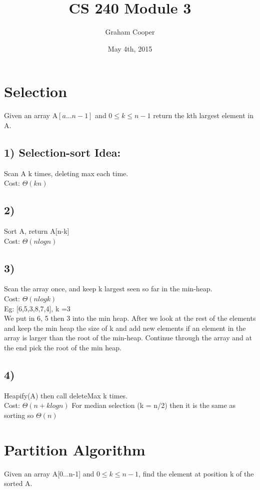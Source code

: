\documentclass[12pt]{article}
\title{\vspace{-15ex}CS 240 Module 3\vspace{-1ex}}
\date{May 4th, 2015}
\author{Graham Cooper}
\begin{document}
	\maketitle
	
	\section*{Selection}
	Given an array A$[a...n-1]$ and $0 \leq k \leq n-1$ return the kth largest element in A.\\
	
	\subsection{1) Selection-sort Idea:}
	Scan A k times, deleting max each time.\\
	Cost: $\Theta(kn)$\\
	\subsection{2)}
	Sort A, return A[n-k]\\
	Cost: $\Theta(nlogn)$\\
	
	\subsection{3)}
	Scan the array once, and keep k largest seen so far in the min-heap.\\
	Cost: $\Theta(nlogk)$\\
	Eg: [6,5,3,8,7,4], k =3\\
	We put in 6, 5 then 3 into the min heap. After we look at the rest of the elements and keep the min heap the size of k and add new elements if an element in the array is larger than the root of the min-heap. Continue through the array and at the end pick the root of the min heap.
	
	\subsection{4)}
	Heapify(A) then call deleteMax k times.\\
	Cost: $\Theta(n + klogn)$ For median selection (k = n/2) then it is the same as sorting so $\Theta(n)$\\
	
	
	
	\section*{Partition Algorithm}
	Given an array A[0...n-1] and $0 \leq k \leq n-1$, find the element at position k of the sorted A.\\
	
\end{document}
